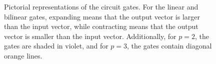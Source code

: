 \begin{figure}[t]

\caption{Pictorial representations of the circuit gates. For the linear and bilinear gates, expanding means that the output vector is larger than the input vector, while contracting means that the output vector is smaller than the input vector. Additionally, for $p=2$, the gates are shaded in violet, and for $p=3$, the gates contain diagonal orange lines.}
\label{fig:graphical_gates}
\end{figure}